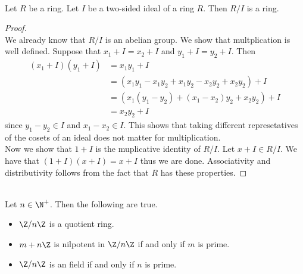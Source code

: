 \documentclass[a4paper]{article}
\begin{document}
\begin{prp}{}{}\\
Let $R$ be a ring. Let $I$ be a two-sided ideal of a ring $R$. Then $R/I$ is a ring. 
\begin{proof}\\
We already know that $R/I$ is an abelian group. We show that multplication is well defined. Suppose that $x_1+I=x_2+I$ and $y_1+I=y_2+I$. Then 
\begin{align*}
(x_1+I)(y_1+I)&=x_1y_1+I\\
&=(x_1y_1-x_1y_2+x_1y_2-x_2y_2+x_2y_2)+I\\
&=(x_1(y_1-y_2)+(x_1-x_2)y_2+x_2y_2)+I\\
&=x_2y_2+I
\end{align*}
since $y_1-y_2\in I$ and $x_1-x_2\in I$. This shows that taking different represetatives of the cosets of an ideal does not matter for multiplication. \\
Now we show that $1+I$ is the muplicative identity of $R/I$. Let $x+I\in R/I$. We have that $(1+I)(x+I)=x+I$ thus we are done. Associativity and distributivity follows from the fact that $R$ has these properties. 
\end{proof}
\end{prp}

\begin{eg}{}{}\\
Let $n\in\N^+$. Then the following are true. 
\begin{itemize}
\item $\Z/n\Z$ is a quotient ring. 
\item $m+n\Z$ is nilpotent in $\Z/n\Z$ if and only if $m$ is prime. 
\item $\Z/n\Z$ is an field if and only if $n$ is prime. 
\end{itemize}
\end{eg}
\end{document}
